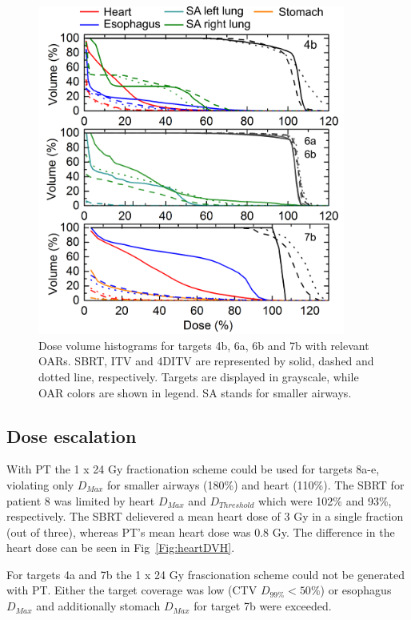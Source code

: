 \newpage
\begin{figure}[H]
	\begin{center}
		\includegraphics[width=0.9\textwidth]{./ComplexPatients/Images/DVH_legend.png}
		\caption{Dose volume histograms for targets 4b, 6a, 6b and 7b with relevant OARs. SBRT, ITV and 4DITV are represented by solid, dashed and dotted line, respectively. Targets are displayed
		in grayscale, while OAR colors are shown in legend. SA stands for smaller airways.}
		\label{Fig:dvh}
	\end{center}
\end{figure}
\newpage


\subsection{Dose escalation}

With PT the 1 x 24 Gy fractionation scheme could be used for targets 8a-e, violating only $D_{Max}$ for smaller airways (180\%) and heart (110\%).
The SBRT for patient 8 was limited by heart $D_{Max}$ and $D_{Threshold}$ which were 102\% and 93\%, respectively. The SBRT delievered a mean heart dose of 
3 Gy in a single fraction (out of three), whereas PT's mean heart dose was 0.8 Gy.
The difference in the heart dose can be seen in Fig~\ref{Fig:heartDVH}.

For targets 4a and 7b the 1 x 24 Gy frascionation scheme could not be generated with PT. Either the target coverage was low (CTV $D_{99\%} < 50\%$) or 
esophagus $D_{Max}$ and additionally stomach $D_{Max}$ for target 7b were exceeded.


